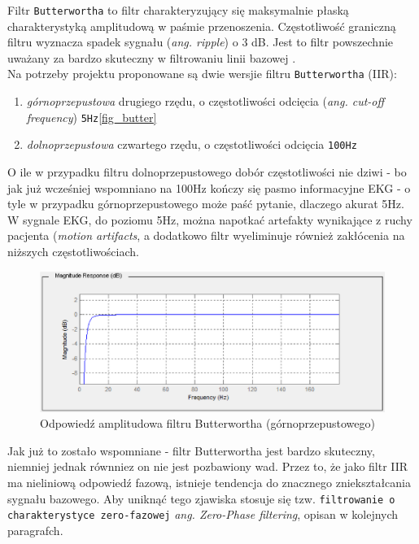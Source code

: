 \documentclass[a4paper, 11pt]{article}
\begin{document}
Filtr \verb|Butterwortha| to filtr charakteryzujący się maksymalnie płaską charakterystyką amplitudową w paśmie przenoszenia. Częstotliwość graniczną filtru wyznacza spadek sygnału (\textit{ang. ripple}) o 3 dB. Jest to filtr powszechnie uważany za bardzo skuteczny w filtrowaniu linii bazowej \cite{KAUR1}.\\
Na potrzeby projektu proponowane są dwie wersjie filtru \verb|Butterwortha| (IIR):
\begin{enumerate}
\item \textit{górnoprzepustowa} drugiego rzędu, o częstotliwości odcięcia (\textit{ang. cut-off frequency}) \verb|5Hz|\eqref{fig_butter}
\item \textit{dolnoprzepustowa} czwartego rzędu, o częstotliwości odcięcia \verb|100Hz|
\end{enumerate}
O ile w przypadku filtru dolnoprzepustowego dobór częstotliwości nie dziwi - bo jak już wcześniej wspomniano na 100Hz kończy się pasmo informacyjne EKG - o tyle w przypadku górnoprzepustowego może paść pytanie, dlaczego akurat 5Hz. W sygnale EKG, do poziomu 5Hz, można napotkać artefakty wynikające z ruchy pacjenta (\textit{motion artifacts}, a dodatkowo filtr wyeliminuje również zakłócenia na niższych częstotliwościach.
\begin{figure}[h]
\centering
\includegraphics[scale=0.5]{include/fig_butter.eps}
\caption{Odpowiedź amplitudowa filtru Butterwortha (górnoprzepustowego)}
\label{fig_butter}
\end{figure}
Jak już to zostało wspomniane - filtr Butterwortha jest bardzo skuteczny, niemniej jednak równniez on nie jest pozbawiony wad. Przez to, że jako filtr IIR ma nieliniową odpowiedź fazową, istnieje tendencja do znacznego zniekształcania sygnału bazowego. Aby uniknąć tego zjawiska stosuje się tzw. \verb|filtrowanie o charakterystyce zero-fazowej| \textit{ang. Zero-Phase filtering}, opisan w kolejnych paragrafch.
\end{document}

